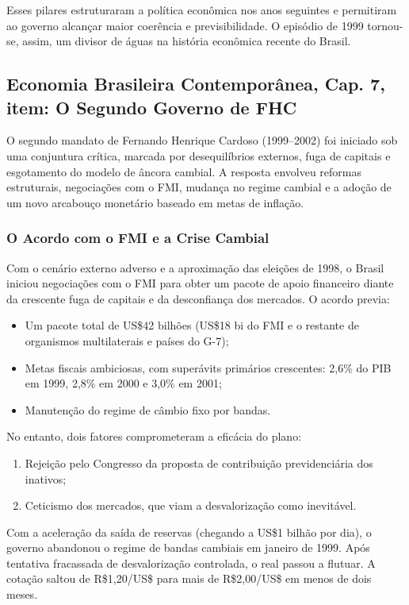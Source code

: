 \documentclass[a4paper,12pt]{article}[abntex2]
\begin{document}
Esses pilares estruturaram a política econômica nos anos seguintes e permitiram ao governo alcançar maior coerência e previsibilidade. O episódio de 1999 tornou-se, assim, um divisor de águas na história econômica recente do Brasil.

\subsection{\textbf{Economia Brasileira Contemporânea, Cap. 7, item: O Segundo Governo de FHC}}

O segundo mandato de Fernando Henrique Cardoso (1999–2002) foi iniciado sob uma conjuntura crítica, marcada por desequilíbrios externos, fuga de capitais e esgotamento do modelo de âncora cambial. A resposta envolveu reformas estruturais, negociações com o FMI, mudança no regime cambial e a adoção de um novo arcabouço monetário baseado em metas de inflação.

\subsubsection{\textbf{O Acordo com o FMI e a Crise Cambial}}

Com o cenário externo adverso e a aproximação das eleições de 1998, o Brasil iniciou negociações com o FMI para obter um pacote de apoio financeiro diante da crescente fuga de capitais e da desconfiança dos mercados. O acordo previa:

\begin{itemize}
    \item Um pacote total de US\$42 bilhões (US\$18 bi do FMI e o restante de organismos multilaterais e países do G-7);
    \item Metas fiscais ambiciosas, com superávits primários crescentes: 2,6\% do PIB em 1999, 2,8\% em 2000 e 3,0\% em 2001;
    \item Manutenção do regime de câmbio fixo por bandas.
\end{itemize}

No entanto, dois fatores comprometeram a eficácia do plano:
\begin{enumerate}
    \item Rejeição pelo Congresso da proposta de contribuição previdenciária dos inativos;
    \item Ceticismo dos mercados, que viam a desvalorização como inevitável.
\end{enumerate}

Com a aceleração da saída de reservas (chegando a US\$1 bilhão por dia), o governo abandonou o regime de bandas cambiais em janeiro de 1999. Após tentativa fracassada de desvalorização controlada, o real passou a flutuar. A cotação saltou de R\$1,20/US\$ para mais de R\$2,00/US\$ em menos de dois meses.
\end{document}
